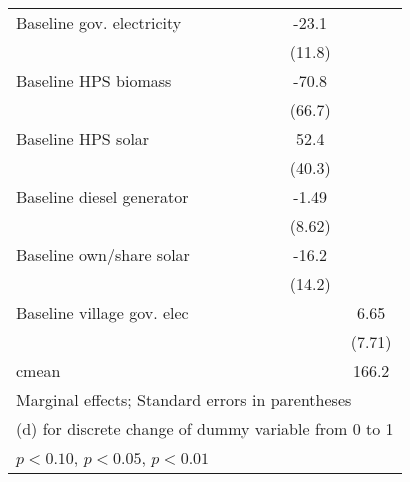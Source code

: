 \begin{table}[htbp]
\begin{tabular*}{1\hsize}{@{\hskip\tabcolsep\extracolsep\fill}l*{6}{c}}
Baseline gov. electricity&                  &                  &                  &                  &    -23.1\sym{*}  &                  \\
                &                  &                  &                  &                  &   (11.8)         &                  \\
Baseline HPS biomass&                  &                  &                  &                  &    -70.8         &                  \\
                &                  &                  &                  &                  &   (66.7)         &                  \\
Baseline HPS solar&                  &                  &                  &                  &     52.4         &                  \\
                &                  &                  &                  &                  &   (40.3)         &                  \\
Baseline diesel generator&                  &                  &                  &                  &    -1.49         &                  \\
                &                  &                  &                  &                  &   (8.62)         &                  \\
Baseline own/share solar&                  &                  &                  &                  &    -16.2         &                  \\
                &                  &                  &                  &                  &   (14.2)         &                  \\
Baseline village gov. elec&                  &                  &                  &                  &                  &     6.65         \\
                &                  &                  &                  &                  &                  &   (7.71)         \\
\midrule
cmean           &                  &                  &                  &                  &                  &    166.2         \\
\bottomrule
\multicolumn{7}{l}{\footnotesize Marginal effects; Standard errors in parentheses}\\
\multicolumn{7}{l}{\footnotesize  (d) for discrete change of dummy variable from 0 to 1}\\
\multicolumn{7}{l}{\footnotesize \sym{*} \(p<0.10\), \sym{**} \(p<0.05\), \sym{***} \(p<0.01\)}\\
\end{tabular*}
\end{table}
